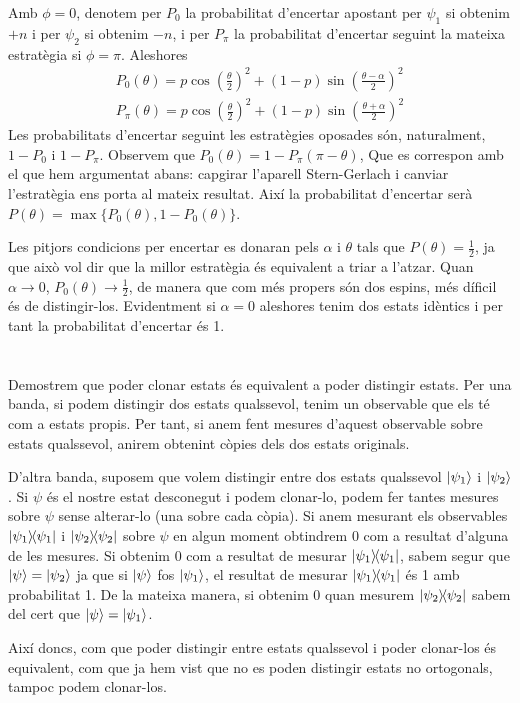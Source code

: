 \documentclass[12pt]{article}
\numberwithin{table}{section}
\numberwithin{figure}{section}
\numberwithin{equation}{section}
\newcommand{\proj}[1]{\ketbra{#1}{#1}}
\begin{document}
Amb \( \phi = 0 \), denotem per \( P_0 \) la probabilitat d'encertar apostant per \( \psi_1 \) si obtenim \( +n \) i per \( \psi_2 \) si obtenim \( -n \), i per \( P_\pi \) la probabilitat d'encertar seguint la mateixa estratègia si \( \phi = \pi \). Aleshores
\begin{gather}
	P_0(\theta) = p \cos{\left(\tfrac{\theta}{2}\right)}^2 + (1-p) \sin{\left(\tfrac{\theta - \alpha}{2}\right)}^2 \\
	P_\pi(\theta) = p \cos{\left(\tfrac{\theta}{2}\right)}^2 + (1-p) \sin{\left(\tfrac{\theta + \alpha}{2}\right)}^2 
\end{gather}
Les probabilitats d'encertar seguint les estratègies oposades són, naturalment, \( 1 - P_0 \) i \( 1 - P_\pi \). Observem que \( P_0(\theta) = 1 - P_\pi(\pi - \theta) \), Que es correspon amb el que hem argumentat abans: capgirar l'aparell Stern-Gerlach i canviar l'estratègia ens porta al mateix resultat. Així la probabilitat d'encertar serà \( P(\theta) = \max{\{P_0(\theta), 1 - P_0(\theta)\}} \). 

Les pitjors condicions per encertar es donaran pels \( \alpha \) i \( \theta \)	tals que \( P(\theta) = \frac{1}{2} \), ja que això vol dir que la millor estratègia és equivalent a triar a l'atzar. Quan \( \alpha \to 0 \), \( P_0(\theta) \to \frac{1}{2} \), de manera que com més propers són dos espins, més díficil és de distingir-los. Evidentment si \( \alpha = 0 \) aleshores tenim dos estats idèntics i per tant la probabilitat d'encertar és 1. 

\section{}
Demostrem que poder clonar estats és equivalent a poder distingir estats. Per una banda, si podem distingir dos estats qualssevol, tenim un observable que els té com a estats propis. Per tant, si anem fent mesures d'aquest observable sobre estats qualssevol, anirem obtenint còpies dels dos estats originals.

D'altra banda, suposem que volem distingir entre dos estats qualssevol \( \ket{\psi_1} \) i \( \ket{\psi_2} \). Si \( \psi \) és el nostre estat desconegut i podem clonar-lo, podem fer tantes mesures sobre \( \psi \) sense alterar-lo (una sobre cada còpia). Si anem mesurant els observables \( \proj{\psi_1} \) i \( \proj{\psi_2} \) sobre \( \psi \) en algun moment obtindrem 0 com a resultat d'alguna de les mesures. Si obtenim 0 com a resultat de mesurar \( \proj{\psi_1} \), sabem segur que \( \ket{\psi} = \ket{\psi_2} \) ja que si \( \ket{\psi} \) fos \( \ket{\psi_1} \), el resultat de mesurar \( \proj{\psi_1} \)	és 1 amb probabilitat 1. De la mateixa manera, si obtenim 0 quan mesurem \( \proj{\psi_2} \) sabem del cert que \( \ket{\psi} = \ket{\psi_1} \).

Així doncs, com que poder distingir entre estats qualssevol i poder clonar-los és equivalent, com que ja hem vist que no es poden distingir estats no ortogonals, tampoc podem clonar-los. 
\end{document}
